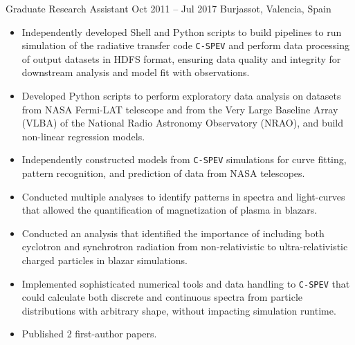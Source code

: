 \cventry{}%
{\UVval}%
{Graduate Research Assistant}%
{Oct 2011 -- Jul 2017}%
{Burjassot, Valencia, Spain}%
{%
\begin{itemize}
    \item Independently developed Shell and Python scripts to build pipelines to run simulation of the radiative transfer code \texttt{C-SPEV} and perform data processing of output datasets in HDFS format, ensuring data quality and integrity for downstream analysis and model fit with observations.
    \item Developed Python scripts to perform exploratory data analysis on datasets from NASA Fermi-LAT telescope and from the Very Large Baseline Array (VLBA) of the National Radio Astronomy Observatory (NRAO), and build non-linear regression models.
    \item Independently constructed models from \texttt{C-SPEV} simulations for curve fitting, pattern recognition, and prediction of data from NASA telescopes.
    \item Conducted multiple analyses to identify patterns in spectra and light-curves that allowed the quantification of magnetization of plasma in blazars.
    \item Conducted an analysis that identified the importance of including both cyclotron and synchrotron radiation from non-relativistic to ultra-relativistic charged particles in blazar simulations.
    \item Implemented sophisticated numerical tools and data handling to \texttt{C-SPEV} that could calculate both discrete and continuous spectra from particle distributions with arbitrary shape, without impacting simulation runtime.
    \item Published 2 first-author papers.
\end{itemize}
}
